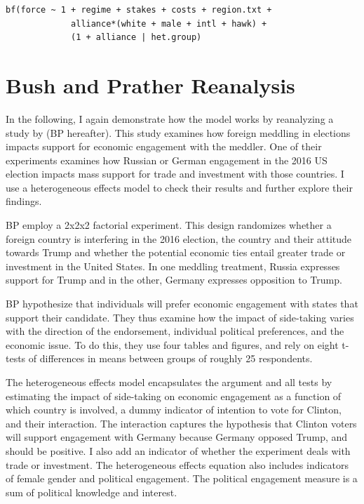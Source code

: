 \documentclass[12pt]{article}
\begin{document}
\begin{verbatim}
bf(force ~ 1 + regime + stakes + costs + region.txt +
             alliance*(white + male + intl + hawk) +
             (1 + alliance | het.group) 
\end{verbatim}



\section{Bush and Prather Reanalysis}


In the following, I again demonstrate how the model works by reanalyzing a study by \citet{BushPrather2020} (BP hereafter). 
This study examines how foreign meddling in elections impacts support for economic engagement with the meddler. 
One of their experiments examines how Russian or German engagement in the 2016 US election impacts mass support for trade and investment with those countries.
I use a heterogeneous effects model to check their results and further explore their findings. 


BP employ a 2x2x2 factorial experiment.
This design randomizes whether a foreign country is interfering in the 2016 election, the country and their attitude towards Trump and whether the potential economic ties entail greater trade or investment in the United States.
In one meddling treatment, Russia expresses support for Trump and in the other, Germany expresses opposition to Trump. 


BP hypothesize that individuals will prefer economic engagement with states that support their candidate. 
They thus examine how the impact of side-taking varies with the direction of the endorsement, individual political preferences, and the economic issue. 
To do this, they use four tables and figures, and rely on eight t-tests of differences in means between groups of roughly 25 respondents. 


The heterogeneous effects model encapsulates the argument and all tests by estimating the impact of side-taking on economic engagement as a function of which country is involved, a dummy indicator of intention to vote for Clinton, and their interaction. 
The interaction captures the hypothesis that Clinton voters will support engagement with Germany because Germany opposed Trump, and should be positive. 
I also add an indicator of whether the experiment deals with trade or investment. 
The heterogeneous effects equation also includes indicators of female gender and political engagement. 
The political engagement measure is a sum of political knowledge and interest. 
\end{document}
